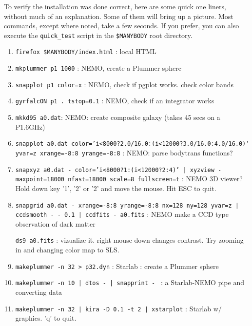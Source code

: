 To verify the installation was done correct, here are some quick
one liners, without much of an explanation. Some of them will bring up
a picture. Most commands, except where noted, take a few seconds. If
you prefer, you can also execute the {\tt quick\_test} script in
the {\tt \$MANYBODY} root directory.
\begin{enumerate}

\item
{\tt firefox \$MANYBODY/index.html} : local HTML 

\item
{\tt mkplummer p1 1000} : NEMO, create a Plummer sphere

\item
{\tt snapplot p1 color=x} : NEMO, check if pgplot works. check color bands 

\item
{\tt gyrfalcON p1 . tstop=0.1} : NEMO, check if an integrator works

\item
{\tt mkkd95 a0.dat}: NEMO: create composite galaxy (takes 45 secs on a P1.6GHz)

\item
{\tt snapplot a0.dat color='i<8000?2.0/16.0:(i<12000?3.0/16.0:4.0/16.0)' yvar=z xrange=-8:8 yrange=-8:8} :
NEMO: parse bodytrans functions?

\item
{\tt snapxyz a0.dat - color='i<8000?1:(i<12000?2:4)' | xyzview - maxpoint=18000 nfast=18000 scale=8 fullscreen=t} : 
NEMO 3D viewer? Hold down key '1', '2' or '2' and move the mouse. Hit ESC to quit.

\item 
{\tt snapgrid a0.dat - xrange=-8:8 yrange=-8:8 nx=128 ny=128 yvar=z | ccdsmooth - - 0.1 | ccdfits - a0.fits} :
NEMO make a CCD type observation of dark matter

{\tt ds9 a0.fits} : vizualize it. right mouse down changes contrast. Try zooming in and changing color map to SLS.

\item
{\tt makeplummer -n 32 > p32.dyn} : Starlab : create a Plummer sphere


\item
{\tt makeplummer -n 10 | dtos - | snapprint - } : a Starlab-NEMO pipe and converting data

\item
{\tt makeplummer -n 32 | kira -D 0.1 -t 2 | xstarplot} : Starlab w/ graphics. 'q' to quit.


\end{enumerate}
